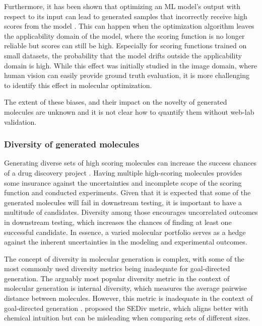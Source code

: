 Furthermore, it has been shown that optimizing an \ac{ML} model's output with respect to its input can
lead to generated samples that incorrectly receive high scores from the model
\citep{szegedyIntriguingPropertiesNeural2014,goodfellowExplainingHarnessingAdversarial2015}.
This can happen when the optimization algorithm leaves the applicability domain of the model, where
the scoring function is no longer reliable but scores can still be high. Especially for scoring
functions trained on small datasets, the probability that the model drifts outside the applicability
domain is high. While this effect was initially studied in the image domain, where human vision can easily provide
ground truth evaluation, it is more challenging to identify this effect in molecular optimization.

The extent of these biases, and their impact on the novelty of generated molecules are unknown and it is
not clear how to quantify them without web-lab validation.

\subsubsection{Diversity of generated molecules}
Generating diverse sets of high scoring molecules can increase the success chances of a drug
discovery project
\citep{martinDiverseViewpointsComputational2001,gorseDiversityMedicinalChemistry2006}. Having
multiple high-scoring molecules provides some insurance against the uncertainties and incomplete
scope of the scoring function and conducted experiments. Given that it is expected that some of
the generated molecules will fail in downstream testing, it is important to have a multitude of
candidates. Diversity among those encourages uncorrelated outcomes in downstream testing, which
increases the chances of finding at least one successful candidate. In essence, a varied molecular
portfolio serves as a hedge against the inherent uncertainties in the modeling and experimental
outcomes.

The concept of diversity in molecular generation is complex, with some of the most commonly used
diversity metrics being inadequate for goal-directed generation. The arguably most popular
diversity metric in the context of molecular generation is internal diversity, which measures the
average pairwise distance between molecules. However, this metric is inadequate in the context of
goal-directed generation \citep{waldmanNovelAlgorithmsOptimization2000,xieMARSMarkovMolecular2021,thomasComparisonStructureLigandbased2021}.
\citet{thomasComparisonStructureLigandbased2021} proposed the \ac{SEDiv}
metric, which aligns better with chemical intuition but can be misleading when comparing sets
of different sizes.

